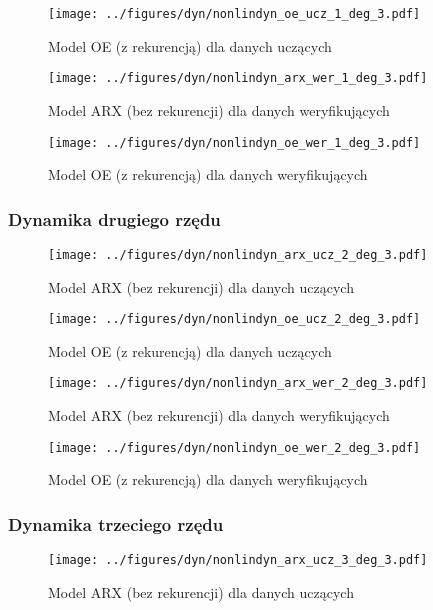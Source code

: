 \documentclass[a4paper,titlepage,11pt,floatssmall]{mwrep}
\begin{document}
\begin{figure}[H]
\centering
\texttt{[image: ../figures/dyn/nonlindyn\_oe\_ucz\_1\_deg\_3.pdf]}
\caption{Model OE (z rekurencją) dla danych uczących}
\end{figure}

\begin{figure}[H]
\centering
\texttt{[image: ../figures/dyn/nonlindyn\_arx\_wer\_1\_deg\_3.pdf]}
\caption{Model ARX (bez rekurencji) dla danych weryfikujących}
\end{figure}

\begin{figure}[H]
\centering
\texttt{[image: ../figures/dyn/nonlindyn\_oe\_wer\_1\_deg\_3.pdf]}
\caption{Model OE (z rekurencją) dla danych weryfikujących}
\end{figure}

\subsubsection{Dynamika drugiego rzędu}
\begin{figure}[H]
\centering
\texttt{[image: ../figures/dyn/nonlindyn\_arx\_ucz\_2\_deg\_3.pdf]}
\caption{Model ARX (bez rekurencji) dla danych uczących}
\end{figure}

\begin{figure}[H]
\centering
\texttt{[image: ../figures/dyn/nonlindyn\_oe\_ucz\_2\_deg\_3.pdf]}
\caption{Model OE (z rekurencją) dla danych uczących}
\end{figure}

\begin{figure}[H]
\centering
\texttt{[image: ../figures/dyn/nonlindyn\_arx\_wer\_2\_deg\_3.pdf]}
\caption{Model ARX (bez rekurencji) dla danych weryfikujących}
\end{figure}

\begin{figure}[H]
\centering
\texttt{[image: ../figures/dyn/nonlindyn\_oe\_wer\_2\_deg\_3.pdf]}
\caption{Model OE (z rekurencją) dla danych weryfikujących}
\end{figure}

\subsubsection{Dynamika trzeciego rzędu}
\begin{figure}[H]
\centering
\texttt{[image: ../figures/dyn/nonlindyn\_arx\_ucz\_3\_deg\_3.pdf]}
\caption{Model ARX (bez rekurencji) dla danych uczących}
\end{figure}
\end{document}
